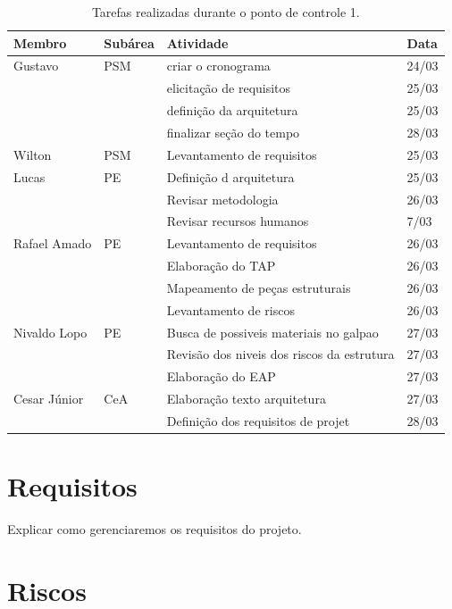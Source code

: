 \begin{table}[h]
  \begin{center}
  \caption{\label{tarefas}Tarefas realizadas durante o ponto de controle 1.}
  \begin{tabular}{|l|l|l|l|}
  \hline
  \textbf{Membro} & \textbf{Subárea} & \textbf{Atividade} & \textbf{Data} \\ \hline\hline
  Gustavo & PSM & criar o cronograma & 24/03 \\ \hline
   &  & elicitação de requisitos & 25/03 \\ \hline
   &  & definição da arquitetura & 25/03 \\ \hline
   &  & finalizar seção do tempo & 28/03 \\ \hline
  Wilton & PSM & Levantamento de requisitos & 25/03 \\ \hline
  Lucas & PE & Definição d arquitetura & 25/03 \\ \hline
   &  & Revisar metodologia & 26/03 \\ \hline
   &  & Revisar recursos humanos & 7/03 \\ \hline
  Rafael Amado & PE & Levantamento de requisitos  & 26/03 \\ \hline
   &  & Elaboração do TAP & 26/03 \\ \hline
   &  & Mapeamento de peças estruturais & 26/03 \\ \hline
   &  & Levantamento de riscos & 26/03 \\ \hline
  Nivaldo Lopo & PE & Busca de possiveis materiais no galpao & 27/03 \\ \hline
   &  & Revisão dos niveis dos riscos da estrutura & 27/03 \\ \hline
   &  & Elaboração do EAP & 27/03 \\ \hline
  Cesar Júnior & CeA & Elaboração texto arquitetura  & 27/03 \\ \hline
   &  & Definição dos requisitos de projet & 28/03 \\ \hline
  \end{tabular}
  \end{center}
\end{table}

\section{Requisitos}

Explicar como gerenciaremos os requisitos do projeto.

\section{Riscos}


